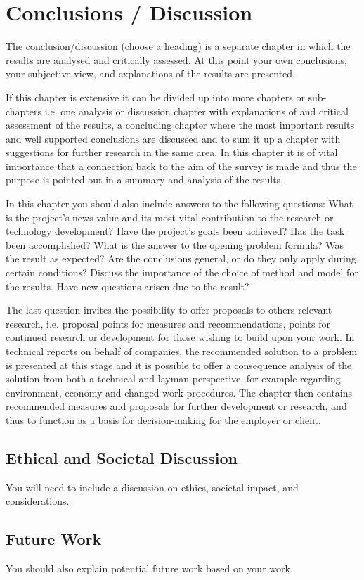 \section{Conclusions / Discussion}
\label{ch:concl}
\noindent	
The conclusion/discussion (choose a heading) is a separate chapter in which the results are analysed and critically assessed. At this point your own conclusions, your subjective view, and explanations of the results are presented.

If this chapter is extensive it can be divided up into more chapters or sub-chapters i.e. one analysis or discussion chapter with explanations of and critical assessment of the results, a concluding chapter where the most important results and well supported conclusions are discussed and to sum it up a chapter with suggestions for further research in the same area. In this chapter it is of vital importance that a connection back to the aim of the survey is made and thus the purpose is pointed out in a summary and analysis of the results. 

In this chapter you should also include answers to the following questions: What is the project's news value and its most vital contribution to the research or technology development? Have the project's goals been achieved? Has the task been accomplished? What is the answer to the opening problem formula? Was the result as expected? Are the conclusions general, or do they only apply during certain conditions? Discuss the importance of the choice of method and model for the results. Have new questions arisen due to the result?

The last question invites the possibility to offer proposals to others relevant research, i.e. proposal points for measures and recommendations, points for continued research or development for those wishing to build upon your work. In technical reports on behalf of companies, the recommended solution to a problem is presented at this stage and it is possible to offer a consequence analysis of the solution from both a technical and layman perspective, for example regarding environment, economy and changed work procedures. The chapter then contains recommended measures and proposals for further development or research, and thus to function as a basis for decision-making for the employer or client.

\subsection{Ethical and Societal Discussion}
\label{ch:concl:ethical}
You will need to include a discussion on ethics, societal impact, and considerations.

\subsection{Future Work}
\label{ch:concl:future-work}
You should also explain potential future work based on your work.
